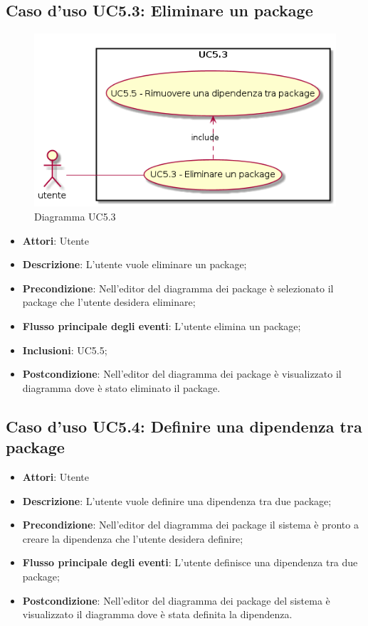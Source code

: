 \documentclass[../AnalisiDeiRequisiti.tex]{subfiles}
\begin{document}
			\subsection{Caso d'uso UC5.3: Eliminare un package}
			\begin{figure} [H]
				\centering
				\includegraphics[scale=0.45]{./Figures/UC5_3.png}
				\caption{Diagramma UC5.3}\label{}
			\end{figure}
			\begin{itemize}
				\item \textbf{Attori}: Utente
				\item \textbf{Descrizione}: L'utente vuole eliminare un package;
				\item \textbf{Precondizione}: Nell'editor del diagramma dei package è selezionato il package che l'utente desidera eliminare;
				\item \textbf{Flusso principale degli eventi}: L'utente elimina un package;
				\item \textbf{Inclusioni}: UC5.5;
				\item \textbf{Postcondizione}: Nell'editor del diagramma dei package è visualizzato il diagramma dove è stato eliminato il package.
			\end{itemize}
			\subsection{Caso d'uso UC5.4: Definire una dipendenza tra package}
			\begin{itemize}
				\item \textbf{Attori}: Utente
				\item \textbf{Descrizione}: L'utente vuole definire una dipendenza tra due package;
				\item \textbf{Precondizione}: Nell'editor del diagramma dei package il sistema è pronto a creare la dipendenza che l'utente desidera definire;
				\item \textbf{Flusso principale degli eventi}: L'utente definisce una dipendenza tra due package;
				\item \textbf{Postcondizione}: Nell'editor del diagramma dei package del sistema è visualizzato il diagramma dove è stata definita la dipendenza.
			\end{itemize}
\end{document}
